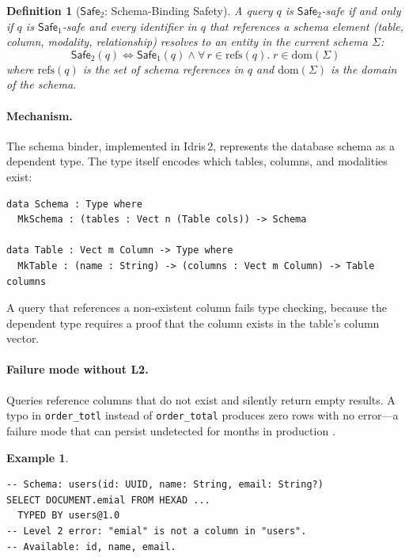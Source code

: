 \documentclass[11pt,a4paper]{article}
\newtheorem{definition}[theorem]{Definition}
\newtheorem{example}[theorem]{Example}
\newcommand{\LevelN}[1]{\textsf{L#1}}
\newcommand{\Safe}[1]{\ensuremath{\mathsf{Safe}_{#1}}}
\begin{document}
\begin{definition}[\Safe{2}: Schema-Binding Safety]
A query $q$ is \Safe{2}-safe if and only if $q$ is \Safe{1}-safe and
every identifier in $q$ that references a schema element (table,
column, modality, relationship) resolves to an entity in the current
schema $\Sigma$:
\[
  \Safe{2}(q) \iff \Safe{1}(q) \land \forall\, r \in \mathrm{refs}(q).\; r \in \mathrm{dom}(\Sigma)
\]
where $\mathrm{refs}(q)$ is the set of schema references in $q$ and
$\mathrm{dom}(\Sigma)$ is the domain of the schema.
\end{definition}

\paragraph{Mechanism.}
The schema binder, implemented in Idris\,2, represents the database
schema as a dependent type.  The type itself encodes which tables,
columns, and modalities exist:

\begin{lstlisting}[language=Idris2]
data Schema : Type where
  MkSchema : (tables : Vect n (Table cols)) -> Schema

data Table : Vect m Column -> Type where
  MkTable : (name : String) -> (columns : Vect m Column) -> Table columns
\end{lstlisting}

A query that references a non-existent column fails type checking,
because the dependent type requires a proof that the column exists
in the table's column vector.

\paragraph{Failure mode without \LevelN{2}.}
Queries reference columns that do not exist and silently return empty
results.  A typo in \texttt{order\_totl} instead of
\texttt{order\_total} produces zero rows with no error---a failure
mode that can persist undetected for months in production
\citep{kim2013silent}.

\begin{example}
\begin{lstlisting}[language=VCL]
-- Schema: users(id: UUID, name: String, email: String?)
SELECT DOCUMENT.emial FROM HEXAD ...
  TYPED BY users@1.0
-- Level 2 error: "emial" is not a column in "users".
-- Available: id, name, email.
\end{lstlisting}
\end{example}
\end{document}
